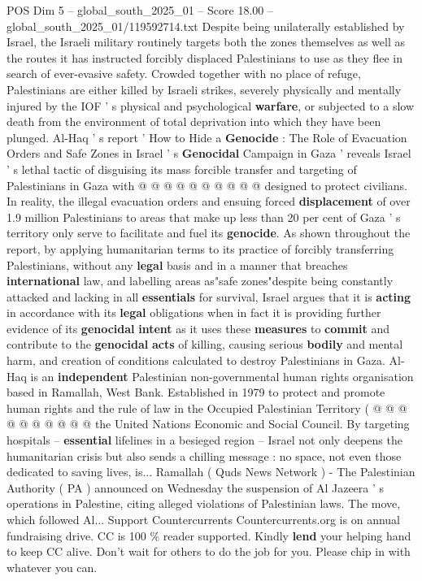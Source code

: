 \begin{textsample}{POS Dim 5 – global\_south\_2025\_01 – Score 18.00 – global\_south\_2025\_01/119592714.txt}
Despite being unilaterally established by Israel, the Israeli military routinely targets both the zones themselves as well as the routes it has instructed forcibly displaced Palestinians to use as they flee in search of ever-evasive safety.
Crowded together with no place of refuge, Palestinians are either killed by Israeli strikes, severely physically and mentally injured by the IOF ' s physical and psychological \textbf{warfare}, or subjected to a slow death from the environment of total deprivation into which they have been plunged.
Al-Haq ' s report ' How to Hide a \textbf{Genocide} : The Role of Evacuation Orders and Safe Zones in Israel ' s \textbf{Genocidal} Campaign in Gaza ' reveals Israel ' s lethal tactic of disguising its mass forcible transfer and targeting of Palestinians in Gaza with @ @ @ @ @ @ @ @ @ @ designed to protect civilians.
In reality, the illegal evacuation orders and ensuing forced \textbf{displacement} of over 1.9 million Palestinians to areas that make up less than 20 per cent of Gaza ' s territory only serve to facilitate and fuel its \textbf{genocide}.
As shown throughout the report, by applying humanitarian terms to its practice of forcibly transferring Palestinians, without any \textbf{legal} basis and in a manner that breaches \textbf{international} law, and labelling areas as"safe zones"despite being constantly attacked and lacking in all \textbf{essentials} for survival, Israel argues that it is \textbf{acting} in accordance with its \textbf{legal} obligations when in fact it is providing further evidence of its \textbf{genocidal} \textbf{intent} as it uses these \textbf{measures} to \textbf{commit} and contribute to the \textbf{genocidal} \textbf{acts} of killing, causing serious \textbf{bodily} and mental harm, and creation of conditions calculated to destroy Palestinians in Gaza.
Al-Haq is an \textbf{independent} Palestinian non-governmental human rights organisation based in Ramallah, West Bank.
Established in 1979 to protect and promote human rights and the rule of law in the Occupied Palestinian Territory ( @ @ @ @ @ @ @ @ @ @ the United Nations Economic and Social Council.
By targeting hospitals -- \textbf{essential} lifelines in a besieged region -- Israel not only deepens the humanitarian crisis but also sends a chilling message : no space, not even those dedicated to saving lives, is...
Ramallah ( Quds News Network ) - The Palestinian Authority ( PA ) announced on Wednesday the suspension of Al Jazeera ' s operations in Palestine, citing alleged violations of Palestinian laws.
The move, which followed Al...
Support Countercurrents Countercurrents.org is on annual fundraising drive.
CC is 100 \% reader supported.
Kindly \textbf{lend} your helping hand to keep CC alive.
Don't wait for others to do the job for you.
Please chip in with whatever you can.

\end{textsample}
